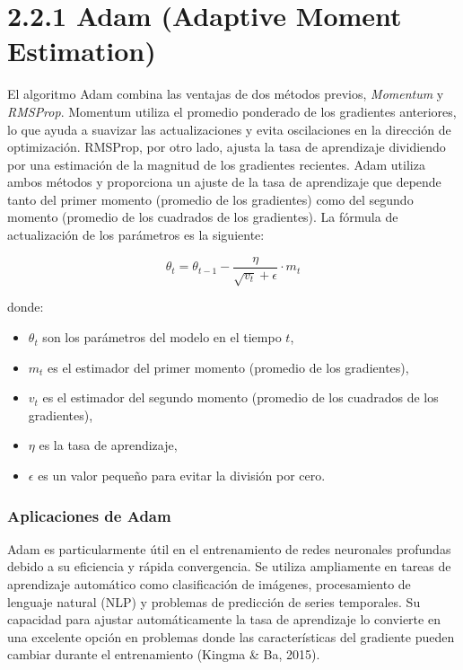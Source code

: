 \documentclass[a5paper]{article}
\begin{document}
	\section*{2.2.1 Adam (Adaptive Moment Estimation)}
	
	El algoritmo Adam combina las ventajas de dos métodos previos, \textit{Momentum} y \textit{RMSProp}. Momentum utiliza el promedio ponderado de los gradientes anteriores, lo que ayuda a suavizar las actualizaciones y evita oscilaciones en la dirección de optimización. RMSProp, por otro lado, ajusta la tasa de aprendizaje dividiendo por una estimación de la magnitud de los gradientes recientes. Adam utiliza ambos métodos y proporciona un ajuste de la tasa de aprendizaje que depende tanto del primer momento (promedio de los gradientes) como del segundo momento (promedio de los cuadrados de los gradientes). La fórmula de actualización de los parámetros es la siguiente:
	
	\[
	\theta_t = \theta_{t-1} - \frac{\eta}{\sqrt{v_t} + \epsilon} \cdot m_t
	\]
	
	donde:
	\begin{itemize}
		\item \( \theta_t \) son los parámetros del modelo en el tiempo \( t \),
		\item \( m_t \) es el estimador del primer momento (promedio de los gradientes),
		\item \( v_t \) es el estimador del segundo momento (promedio de los cuadrados de los gradientes),
		\item \( \eta \) es la tasa de aprendizaje,
		\item \( \epsilon \) es un valor pequeño para evitar la división por cero.
	\end{itemize}
	
	\subsubsection*{Aplicaciones de Adam}
	
	Adam es particularmente útil en el entrenamiento de redes neuronales profundas debido a su eficiencia y rápida convergencia. Se utiliza ampliamente en tareas de aprendizaje automático como clasificación de imágenes, procesamiento de lenguaje natural (NLP) y problemas de predicción de series temporales. Su capacidad para ajustar automáticamente la tasa de aprendizaje lo convierte en una excelente opción en problemas donde las características del gradiente pueden cambiar durante el entrenamiento (Kingma \& Ba, 2015).
	
\end{document}
